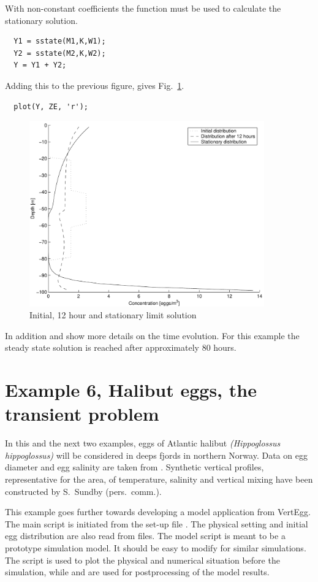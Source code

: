 With non-constant coefficients the function  must be used
to calculate the stationary solution.
\begin{verbatim}
  Y1 = sstate(M1,K,W1);
  Y2 = sstate(M2,K,W2);
  Y = Y1 + Y2;
\end{verbatim}
Adding this to the previous figure, gives Fig.~\ref{fig:ex5b}.
\begin{verbatim}
  plot(Y, ZE, 'r'); 
\end{verbatim}

\begin{figure}[h]
\begin{center}
\includegraphics[height=8cm]{ex5b}
\end{center}
\caption{Initial, 12 hour and stationary limit solution}\label{fig:ex5b}
\end{figure}

In addition  and  show more details on the
time evolution. For this example the steady state solution is reached
after approximately 80 hours.



\section{Example 6, Halibut eggs, the transient problem}

 
In this and the next two examples, eggs of Atlantic halibut
\emph{(Hippoglossus hippoglossus)} will be considered
in deeps fjords in northern Norway. Data on egg diameter and egg
salinity are taken from \citep{haug84}.  Synthetic vertical profiles,
representative for the area, of temperature, salinity and vertical
mixing have been constructed by S.~Sundby (pers.~comm.).

This example goes further towards developing a model application from
VertEgg. The main script  is initiated from the set-up file
. The physical setting and initial egg distribution are
also read from files.
The model script is meant to be a prototype simulation model.
It should be easy to modify for similar simulations.
The script  is
used to plot the  physical and numerical situation before the
simulation, while  and  are used for 
postprocessing of the model results. 

